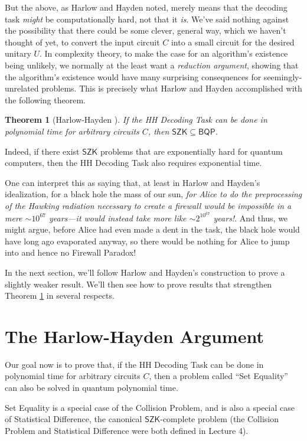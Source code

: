 \documentclass[11pt]{report}
\theoremstyle{plain}
\newtheorem{theorem}{Theorem}[section]
\theoremstyle{definition}
\begin{document}
But the above, as Harlow and Hayden noted, merely means that the decoding task {\em might} be computationally hard, not that it {\em is}.  We've said nothing against the possibility that there could be some clever, general way, which we haven't thought of yet, to convert the input circuit $C$ into a small circuit for the desired unitary $U$.  In complexity theory, to make the case for an algorithm's existence being unlikely, we normally at the least want a {\em reduction argument}, showing that the algorithm's existence would have many surprising consequences for seemingly-unrelated problems.  This is precisely what Harlow and Hayden accomplished with the following theorem.

\begin{theorem}[Harlow-Hayden \cite{harlowhayden}]
\label{hhthm}
If the HH Decoding Task can be done in polynomial time for arbitrary circuits $C$,
then $\mathsf{SZK} \subseteq \mathsf{BQP}$.
\end{theorem}

Indeed, if there exist $\mathsf{SZK}$ problems that are exponentially hard for quantum computers, then the HH Decoding Task also requires exponential time.

One can interpret this as saying that, at least in Harlow and Hayden's idealization, for a black hole the mass of our sun, {\em for Alice to do the preprocessing of the Hawking radiation necessary to create a firewall would be impossible in a mere $\sim 10^{67}$ years---it would instead take more like $\sim 2^{10^{67}}$ years!}.  And thus, we might argue, before Alice had even made a dent in the task, the black hole would have long ago evaporated anyway, so there would be nothing for Alice to jump into and hence no Firewall Paradox!

In the next section, we'll follow Harlow and Hayden's construction to prove a slightly weaker result.  We'll then see how to prove results that strengthen Theorem \ref{hhthm} in several respects.

\section{The Harlow-Hayden Argument}

Our goal now is to prove that, if the HH Decoding Task can be done in polynomial time for arbitrary circuits $C$, then a problem called ``Set Equality'' can also be solved in quantum polynomial time.

Set Equality is a special case of the Collision Problem, and is also a special case of Statistical Difference,
the canonical $\mathsf{SZK}$-complete problem (the Collision Problem and Statistical Difference were both defined in Lecture 4).
\end{document}
